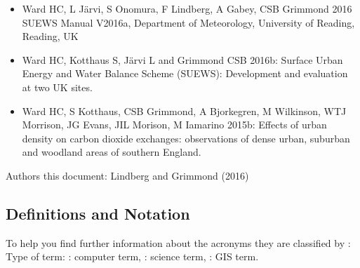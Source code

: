 \documentclass[letterpaper,10pt,english]{sphinxmanual}
\begin{document}
\begin{itemize}
\item {} 
Ward HC, L Järvi, S Onomura, F Lindberg, A Gabey, CSB Grimmond 2016
SUEWS Manual V2016a,  Department
of Meteorology, University of Reading, Reading, UK

\item {} 
Ward HC, Kotthaus S, Järvi L and Grimmond CSB 2016b: Surface Urban
Energy and Water Balance Scheme (SUEWS): Development and evaluation
at two UK sites. 

\item {} 
Ward HC, S Kotthaus, CSB Grimmond, A Bjorkegren, M Wilkinson, WTJ
Morrison, JG Evans, JIL Morison, M Iamarino 2015b: Effects of urban
density on carbon dioxide exchanges: observations of dense urban,
suburban and woodland areas of southern England. 

\end{itemize}

Authors this document: Lindberg and Grimmond (2016)


\subsection{Definitions and Notation}
\label{\detokenize{Tutorials/IntroductionToSuews:definitions-and-notation}}
To help you find further information about the acronyms they are
classified by : Type of term: : computer term, : science
term, : GIS term.
\end{document}
